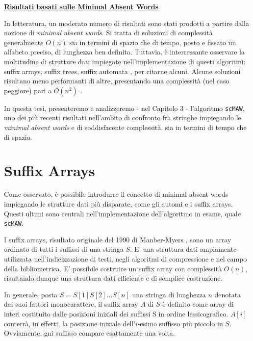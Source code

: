 \vspace{10mm}

\underline{\textbf{Risultati basati sulle Minimal Absent Words}}

\vspace{5mm}

In letteratura, un moderato numero di risultati sono stati prodotti a partire dalla nozione di \textit{minimal absent words}. Si tratta di soluzioni di complessità generalmente $O(n)$ sia in termini di spazio che di tempo, posto e fissato un alfabeto preciso, di lunghezza ben definita. Tuttavia, è interressante osservare la moltitudine di strutture dati impiegate nell'implementazione di questi algoritmi: suffix arrays, suffix trees, suffix automata \cite{maw1}, per citarne alcuni. Alcune soluzioni risultano meno performanti di altre, presentando una complessità (nel caso peggiore) pari a $O(n^2 )$ \cite{findingMaw}.

\vspace{3mm}

In questa tesi, presenteremo e analizzeremo - nel Capitolo 3 - l'algoritmo \verb|scMAW|, uno dei più recenti risultati nell'ambito di confronto fra stringhe impiegando le \textit{minimal absent words} e di soddisfacente complessità, sia in termini di tempo che di spazio.

\section{Suffix Arrays}

Come osservato, è possibile introdurre il concetto di minimal absent words impiegando le strutture dati più disparate, come gli automi e i suffix arrays. Questi ultimi sono centrali nell'implementazione dell'algoritmo in esame, quale \verb|scMAW|.

\vspace{3mm}

I suffix arrays, risultato originale del 1990 di Manber-Myers \cite{suffixArray}, sono un array ordinato di tutti i suffissi di una stringa $S$. E' una struttura dati ampiamente utilizzata nell'indicizzazione di testi, negli algoritmi di compressione e nel campo della bibliometrica. E' possibile costruire un suffix array con complessità $O(n)$, risultando dunque una struttura dati efficiente e di semplice costruzione.

\vspace{3mm}

In generale, posta $S=S[1]S[2]...S[n]$ una stringa di lunghezza $n$ denotata dai suoi fattori monocarattere, il suffix array $A$ di $S$ è definito come array di interi costituito dalle posizioni iniziali dei suffissi S in ordine lessicografico. $A[i]$ conterrà, in effetti, la posizione iniziale dell'$i$-esimo suffisso più piccolo in $S$. Ovviamente, gni suffisso compare esattamente una volta. 

